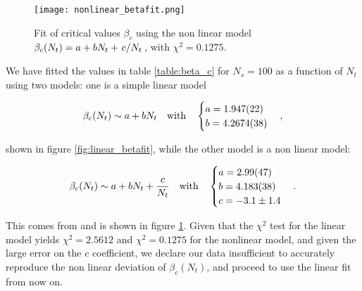 \documentclass[reqno,12pt]{article}
\numberwithin{equation}{section}
\begin{document}
\begin{figure}[h]
	\centering
	\texttt{[image: nonlinear\_betafit.png]}
	\caption[Non linear fit for $\beta_c(N_t)$]{Fit of critical values $\beta_c$ using the non linear model 
	$\beta_c(N_t) = a + bN_t + \flatfrac{c}{N_t}$, with $\chi^2 = 0.1275$.}
\label{fig:nonlinear_betafit}
\end{figure}

We have fitted the values in table \ref{table:beta_c} for $N_s = 100$ as a function of $N_t$
using two models: one is a simple linear model

\begin{equation} \label{eq:beta_fit}
	\beta_c(N_t) \sim a + bN_t \qq{with}
	\begin{cases}
		a = 1.947(22) \\
		b = 4.2674(38)
	\end{cases},
\end{equation}

shown in figure \ref{fig:linear_betafit}, while the other model is a non linear model:

\begin{equation}
	\beta_c(N_t) \sim a + b N_t + \frac{c}{N_t} \qq{with} 
	\begin{cases}
		a = 2.99(47) \\
		b = 4.183(38) \\
		c = -3.1 \pm 1.4
	\end{cases}.
\end{equation}

This comes from \cite{beta-fit} and is shown in figure \ref{fig:nonlinear_betafit}. Given that the $\chi^2$ test
for the linear model yields $\chi^2 = 2.5612$ and $\chi^2 = 0.1275$ for the nonlinear model, and given the large error
on the $c$ coefficient, we declare our data insufficient to accurately reproduce the non linear deviation of $\beta_c(N_t)$,
and proceed to use the linear fit from now on.
\end{document}
